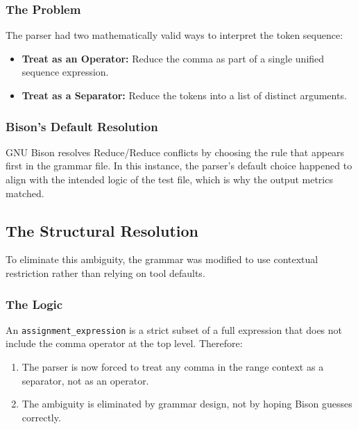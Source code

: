 \documentclass{article}
\begin{document}
\subsubsection{The Problem}

The parser had two mathematically valid ways to interpret the token sequence:

\begin{itemize}
    \item \textbf{Treat as an Operator:} Reduce the comma as part of a single unified sequence expression.
    \item \textbf{Treat as a Separator:} Reduce the tokens into a list of distinct arguments.
\end{itemize}

\subsubsection{Bison's Default Resolution}

GNU Bison resolves Reduce/Reduce conflicts by choosing the rule that appears first in the grammar file. In this instance, the parser's default choice happened to align with the intended logic of the test file, which is why the output metrics matched.

\subsection{The Structural Resolution}

To eliminate this ambiguity, the grammar was modified to use contextual restriction rather than relying on tool defaults.



\subsubsection{The Logic}

An \texttt{assignment\_expression} is a strict subset of a full expression that does not include the comma operator at the top level. Therefore:

\begin{enumerate}
    \item The parser is now forced to treat any comma in the range context as a separator, not as an operator.
    \item The ambiguity is eliminated by grammar design, not by hoping Bison guesses correctly.
\end{enumerate}
\end{document}
